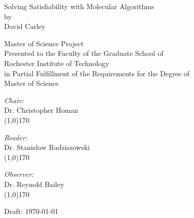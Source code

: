 \begin{titlepage}

	\begin{center}
	
		{\LARGE Solving {\sc Satisfiability} with Molecular Algorithms}\\[1.5cm]
		by\\
		\vspace{0.5cm}
		{\large David Carley}\\

		\vspace{1cm}
		
{\large Master of Science Project}\\
				\vspace{0.5cm}
Presented to the Faculty of the Graduate School of\\
		\vspace{0.5cm}				
Rochester Institute of Technology\\
		\vspace{0.5cm}
in Partial Fulfillment of the Requirements for the Degree of\\
		\vspace{0.5cm}
{\large Master of Science}
		
		\vspace{1cm}
		
		\begin{minipage}{0.4\textwidth}
			\begin{flushleft} \large

			\end{flushleft}
			\end{minipage}
			\begin{minipage}{0.4\textwidth}
			\begin{flushleft} \large

				\emph{Chair:} \\
				Dr. Christopher Homan
				\vspace{1cm}\\
				\line(1,0){170}\\
				\vspace{0.2cm}

				\emph{Reader:} \\
				Dr. Stanis\l aw Radziszowski
				\vspace{1cm}\\
				\line(1,0){170}\\
				\vspace{0.2cm}
				
				\emph{Observer:} \\
				Dr. Reynold Bailey
				\vspace{1cm}\\
				\line(1,0){170}
				
			\end{flushleft}
		\end{minipage}
	
		\vfill
		
		{\large Draft: \today}
	
	\end{center}

\end{titlepage}